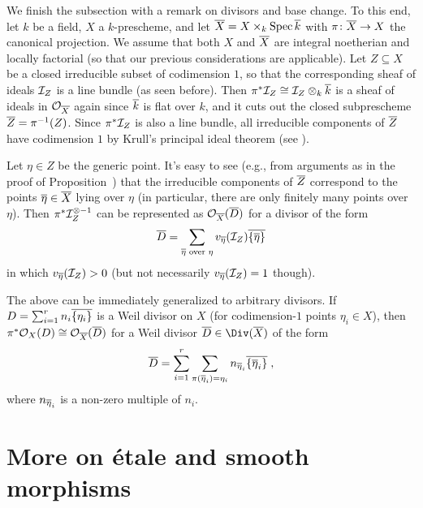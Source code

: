 \documentclass[a4paper,parskip=half,numbers=enddot, DIV=12]{scrreprt}
\begin{document}
We finish the subsection with a remark on divisors and base change. To this end, let $k$ be a field, $X$ a $k$-prescheme, and let $\overline{X}=X\times_k\operatorname{Spec}\overline{k}$ with $\pi\colon \ov{X}\morphism X$ the canonical projection. We assume that both $X$ and $\overline{X}$ are integral noetherian and locally factorial (so that our previous considerations are applicable). Let $Z\subseteq X$ be a closed irreducible subset of codimension $1$, so that the corresponding sheaf of ideals $\mathcal{I}_Z$ is a line bundle (as seen before). Then $\pi^*\mathcal{I}_Z\cong\mathcal{I}_Z\otimes_k\overline{k}$ is a sheaf of ideals in $\mathcal{O}_{\overline{X}}$ again since $\overline{k}$ is flat over $k$, and it cuts out the closed subprescheme $\overline{Z}=\pi^{-1}(Z)$. Since $\pi^*\mathcal{I}_Z$ is also a line bundle, all irreducible components of $\overline{Z}$ have codimension $1$ by Krull's principal ideal theorem (see \cite[Theorem~11]{alg2}).

Let $\eta\in Z$ be the generic point. It's easy to see (e.g., from arguments as in the proof of Proposition~) that the irreducible components of $\overline{Z}$ correspond to the points $\overline{\eta}\in \overline{X}$ lying over $\eta$ (in particular, there are only finitely many points over $\eta$). Then $\pi^*\mathcal{I}_Z^{\otimes -1}$ can be represented as $\mathcal{O}_{\overline{X}}(\overline{D})$ for a divisor of the form
\begin{align*}
	\overline{D}=\sum_{\overline{\eta}\text{ over }\eta}v_{\overline{\eta}}(\mathcal{I}_Z)\overline{\{\overline{\eta}\}}
\end{align*}
in which $v_{\overline{\eta}}(\mathcal{I}_Z)>0$ (but not necessarily $v_{\overline{\eta}}(\mathcal{I}_Z)=1$ though).

The above can be immediately generalized to arbitrary divisors. If $D=\sum_{i=1}^rn_i\overline{\{\eta_i\}}$ is a Weil divisor on $X$ (for codimension-$1$ points $\eta_i\in X$), then $\pi^*\mathcal{O}_X(D)\cong \mathcal{O}_{\overline{X}}(\overline{D})$ for a Weil divisor $\ov{D}\in\Div(\ov{X})$ of the form
\begin{align}\lbl{eq:divisorPullback}
	\ov{D}=\sum_{i=1}^r\sum_{\pi(\ov{\eta}_i)=\eta_i}n_{\ov{\eta}_i}\ov{\{\ov{\eta}_i\}}\;,
\end{align}
where $n_{\overline{\eta}_i}$ is a non-zero multiple of $n_i$.

\section{More on étale and smooth morphisms}
\end{document}

